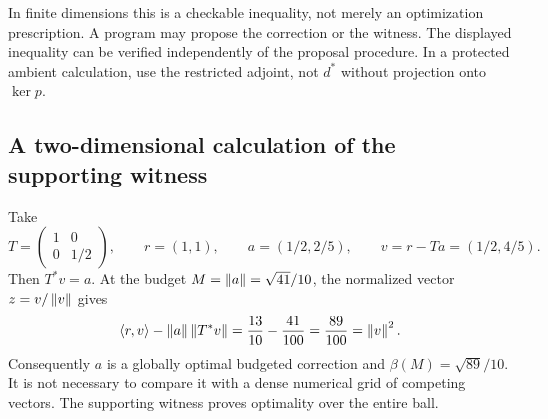 In finite dimensions this is a checkable inequality, not merely an optimization prescription. A program may propose the correction or the witness. The displayed inequality can be verified independently of the proposal procedure. In a protected ambient calculation, use the restricted adjoint, not $d^*$ without projection onto $\ker p$.

\subsection{A two-dimensional calculation of the supporting witness}
Take
\[
 T=\begin{pmatrix}1&0\\0&1/2\end{pmatrix},\qquad r=(1,1),\qquad
 a=(1/2,2/5),\qquad v=r-Ta=(1/2,4/5).
\]
Then $T^*v=a$. At the budget $M=\left\lVert a\right\rVert=\sqrt{41}/10$, the normalized vector $z=v/\left\lVert v\right\rVert$ gives
\[
 \langle r,v\rangle-\left\lVert a\right\rVert\left\lVert T^*v\right\rVert
 =\frac{13}{10}-\frac{41}{100}=\frac{89}{100}=\left\lVert v\right\rVert^2.
\]
Consequently $a$ is a globally optimal budgeted correction and $\beta(M)=\sqrt{89}/10$. It is not necessary to compare it with a dense numerical grid of competing vectors. The supporting witness proves optimality over the entire ball.


